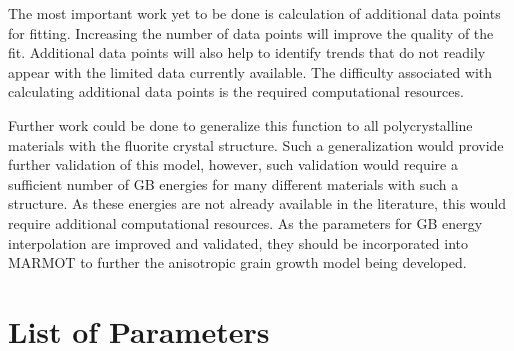 \documentclass[twoside,senior]{BYUPhys}
\begin{document}
The most important work yet to be done is calculation of additional data points for fitting.  Increasing the number of data points will improve the quality of the fit.  Additional data points will also help to identify trends that do not readily appear with the limited data currently available.  The difficulty associated with calculating additional data points is the required computational resources.  %

Further work could be done to generalize this function to all polycrystalline materials with the fluorite crystal structure.  Such a generalization would provide further validation of this model, however, such validation would require a sufficient number of GB energies for many different materials with such a structure.  As these energies are not already available in the literature, this would require additional computational resources.  As the parameters for GB energy interpolation are improved and validated, they should be incorporated into MARMOT to further the anisotropic grain growth model being developed.

\appendix

 \cleardoublepage
 

\chapter{List of Parameters\label{app:params}}
\end{document}
